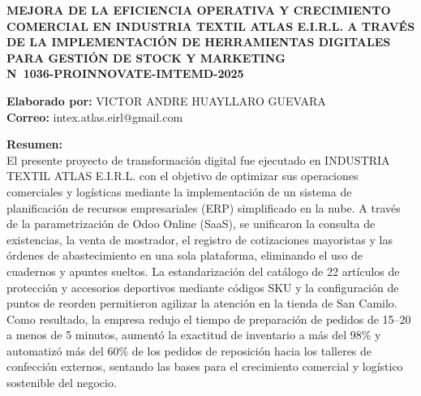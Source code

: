 \documentclass[12pt]{article}
\begin{document}
\vspace*{0.2cm}

\begin{center}
    {\large \textbf{MEJORA DE LA EFICIENCIA OPERATIVA Y CRECIMIENTO COMERCIAL EN INDUSTRIA TEXTIL ATLAS E.I.R.L. A TRAVÉS DE LA IMPLEMENTACIÓN DE HERRAMIENTAS DIGITALES PARA GESTIÓN DE STOCK Y MARKETING}}\\[0.4cm]
    {\large \textbf{N\textdegree\ 1036-PROINNOVATE-IMTEMD-2025}}
\end{center}

\textbf{Elaborado por:} VICTOR ANDRE HUAYLLARO GUEVARA\\
\textbf{Correo:} intex.atlas.eirl@gmail.com

\textbf{Resumen:}\\
El presente proyecto de transformación digital fue ejecutado en INDUSTRIA TEXTIL ATLAS E.I.R.L. con el objetivo de optimizar sus operaciones comerciales y logísticas mediante la implementación de un sistema de planificación de recursos empresariales (ERP) simplificado en la nube. A través de la parametrización de Odoo Online (SaaS), se unificaron la consulta de existencias, la venta de mostrador, el registro de cotizaciones mayoristas y las órdenes de abastecimiento en una sola plataforma, eliminando el uso de cuadernos y apuntes sueltos. La estandarización del catálogo de 22 artículos de protección y accesorios deportivos mediante códigos SKU y la configuración de puntos de reorden permitieron agilizar la atención en la tienda de San Camilo. Como resultado, la empresa redujo el tiempo de preparación de pedidos de 15--20 a menos de 5 minutos, aumentó la exactitud de inventario a más del 98\% y automatizó más del 60\% de los pedidos de reposición hacia los talleres de confección externos, sentando las bases para el crecimiento comercial y logístico sostenible del negocio.
\end{document}
